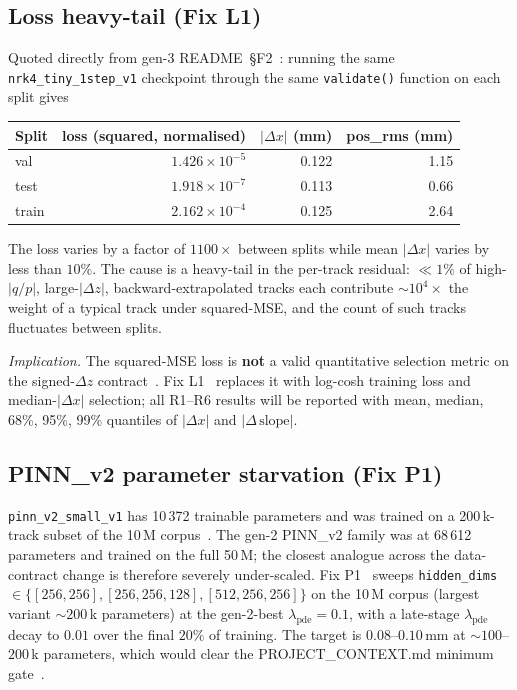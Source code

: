 \documentclass[11pt,a4paper]{article}
\begin{document}
\subsection{Loss heavy-tail (Fix L1)}\label{sec:f2}

Quoted directly from gen-3 README~\S F2~\cite{gen3readme}: running
the same \texttt{nrk4\_tiny\_1step\_v1} checkpoint through the same
\texttt{validate()} function on each split gives
\begin{center}
\begin{tabular}{lrrr}
\toprule
Split & loss (squared, normalised) & $|\Delta x|$ (mm) & pos\_rms (mm) \\
\midrule
val   & $1.426\times 10^{-5}$ & 0.122 & 1.15 \\
test  & $1.918\times 10^{-7}$ & 0.113 & 0.66 \\
train & $2.162\times 10^{-4}$ & 0.125 & 2.64 \\
\bottomrule
\end{tabular}
\end{center}
The loss varies by a factor of $1100\times$ between splits while
mean $|\Delta x|$ varies by less than $10\%$. The cause is a
heavy-tail in the per-track residual: $\ll 1\%$ of high-$|q/p|$,
large-$|\Delta z|$, backward-extrapolated tracks each contribute
$\sim 10^4\times$ the weight of a typical track under squared-MSE,
and the count of such tracks fluctuates between splits.

\emph{Implication.} The squared-MSE loss is \textbf{not} a valid
quantitative selection metric on the signed-$\Delta z$
contract~\cite{gen3readme}. Fix L1~\cite{replacementplan} replaces
it with log-cosh training loss and median-$|\Delta x|$ selection;
all R1--R6 results will be reported with mean, median, 68\%, 95\%,
99\% quantiles of $|\Delta x|$ and $|\Delta\,\text{slope}|$.

\subsection{PINN\_v2 parameter starvation (Fix P1)}\label{sec:p1}

\texttt{pinn\_v2\_small\_v1} has 10\,372 trainable parameters and
was trained on a 200\,k-track subset of the 10\,M
corpus~\cite{gen3readme}. The gen-2 PINN\_v2 family was at
68\,612 parameters and trained on the full 50\,M; the closest
analogue across the data-contract change is therefore severely
under-scaled. Fix P1~\cite{replacementplan} sweeps
\texttt{hidden\_dims} $\in
\{[256,256], [256,256,128], [512,256,256]\}$ on the 10\,M corpus
(largest variant $\sim 200$\,k parameters) at the gen-2-best
$\lambda_{\mathrm{pde}}=0.1$, with a late-stage $\lambda_{\mathrm{pde}}$
decay to $0.01$ over the final $20\%$ of training. The target is
$0.08$--$0.10$\,mm at $\sim 100$--$200$\,k parameters, which would
clear the PROJECT\_CONTEXT.md minimum gate~\cite{projectcontext}.
\end{document}
